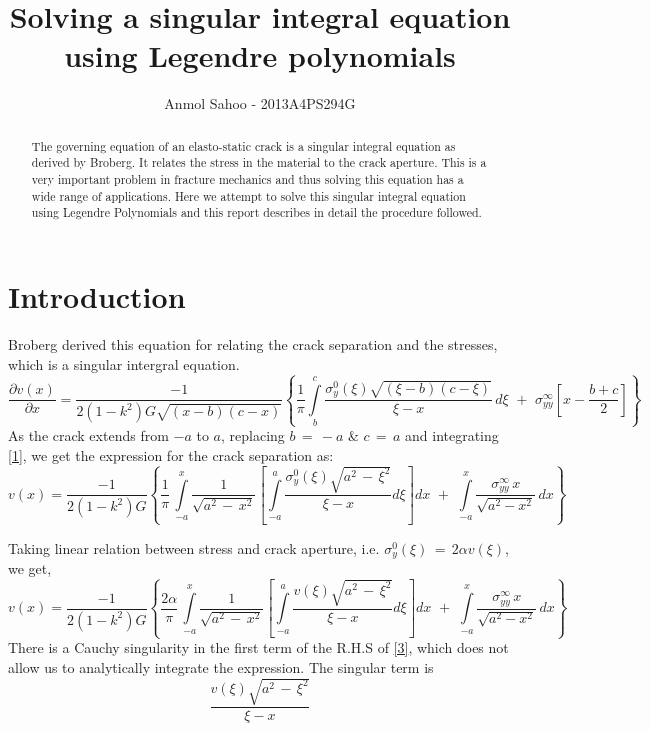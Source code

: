 \documentclass[1p,preprint,12pt]{elsarticle1}
\begin{document}
\begin{frontmatter}

\title{Solving a singular integral equation using Legendre polynomials}
\begin{abstract}
The governing equation of an elasto-static crack is a singular integral equation as derived by Broberg. It relates the stress in the material to the crack aperture. This is a very important problem in fracture mechanics and thus solving this equation has a wide range of applications. Here we attempt to solve this singular integral equation using Legendre Polynomials and this report describes in detail the procedure followed.
\end{abstract}
\author{Anmol Sahoo - 2013A4PS294G}
\end{frontmatter}

\section{Introduction}
Broberg derived this equation for relating the crack separation and the stresses, which is a singular intergral equation.
\begin{equation}\label{eq:1}
			\frac{\partial v(x)}{\partial x} = \frac{-1}{2(1-k^2)G\sqrt{(x-b)(c-x)}}\left\{ \frac{1}{\pi}\int\limits_{b}^c \frac{\sigma_y^0(\xi)\sqrt{(\xi-b)(c-\xi)}}{\xi-x}\,d\xi \,\,+\,\, \sigma^{\infty}_{yy}[x-\frac{b+c}{2}]\right\}
\end{equation}
As the crack extends from \(-a\) to \(a\), replacing \(b\,=\,-a\) \& \(c\, =\,a \) and integrating \ref{1}, we get the expression for the crack separation as:
\begin{equation*}
			v(x) = \frac{-1}{2(1-k^2)G}\left \{\frac{1}{\pi}\,\int\limits_{-a}^x \frac{1}{\sqrt{a^2\,-\,x^2}}\left[\int\limits_{-a}^a \frac{\sigma_y^0(\xi)\sqrt{a^2\,-\,\xi^2}}{\xi-x}d\xi\right]dx \,\,+\,\, \int\limits_{-a}^x \frac{\sigma^{\infty}_{yy}\,x}{\sqrt{a^2-x^2}}\,dx\right\}
		\end{equation*}

Taking linear relation between stress and crack aperture, i.e. \(\sigma_y^0(\xi)\,=\,2\alpha v(\xi)\), we get,
\begin{equation}\label{3}
			v(x) = \frac{-1}{2(1-k^2)G}\left \{\frac{2\alpha}{\pi}\,\int\limits_{-a}^x \frac{1}{\sqrt{a^2\,-\,x^2}}\left[\int\limits_{-a}^a \frac{v(\xi)\sqrt{a^2\,-\,\xi^2}}{\xi-x}d\xi\right]dx \,\,+\,\, \int\limits_{-a}^x \frac{\sigma^{\infty}_{yy}\,x}{\sqrt{a^2-x^2}}\,dx\right\}
		\end{equation}
There is a Cauchy singularity in the first term of the R.H.S of \ref{3}, which does not allow us to analytically integrate the expression. The singular term is $$\frac{v(\xi)\sqrt{a^2\,-\,\xi^2}}{\xi-x}$$
\end{document}

